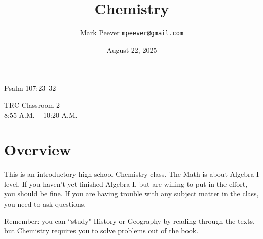 \documentclass[11pt, oneside]{article}   	%
\title{Chemistry}
\author{Mark Peever \texttt{mpeever@gmail.com}}
\date{August 22, 2025}
\begin{document}
\maketitle

\begin{center}
Psalm 107:23--32
\end{center}

TRC Classroom 2       \\
8:55 A.M. -- 10:20 A.M. \\ 


\section{Overview}

This is an introductory high school Chemistry class. 
The Math is about Algebra I level. If you haven't yet finished Algebra I, but are willing to put in the effort, you should be fine.
If you are having trouble with any subject matter in the class, you need to ask questions.

Remember: you can ``study" History or Geography by reading through the texts, but Chemistry requires you to solve problems out of the book. 

\section{}
\end{document}
